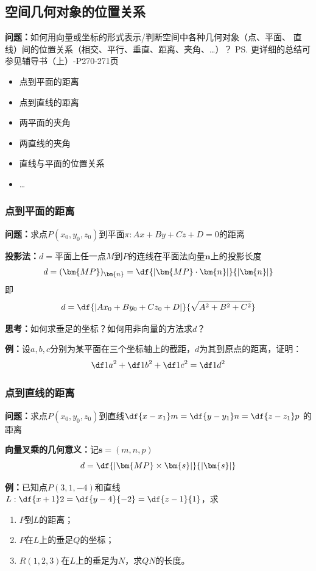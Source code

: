 \subsection{空间几何对象的位置关系}

{\bf 问题：}如何用向量或坐标的形式表示/判断空间中各种几何对象（点、平面、
直线）间的位置关系（相交、平行、垂直、距离、夹角、\ldots）？ 
\ps{更详细的总结可参见辅导书（上）-P270-271页}
\begin{itemize}
  \item 点到平面的距离 
  \item 点到直线的距离 
  \item 两平面的夹角 
  \item 两直线的夹角 
  \item 直线与平面的位置关系
  \item \ldots
\end{itemize}

\subsubsection{点到平面的距离}

{\bf 问题：}求点$P(x_0,y_0,z_0)$到平面$\pi:Ax+By+Cz+D=0$的距离

{\bf 投影法：}$d=$平面上任一点$M$到$P$的连线在平面法向量$\bm{n}$上的投影长度 
$$d=(\bm{MP})_{\bm{n}}=\df{|\bm{MP}\cdot\bm{n}|}{|\bm{n}|}$$ 
即
$${d=\df{|Ax_0+By_0+Cz_0+D|}{\sqrt{A^2+B^2+C^2}}}$$

{\bf 思考：}如何求垂足的坐标？如何用非向量的方法求$d$？

{\bf 例：}设$a,b,c$分别为某平面在三个坐标轴上的截距，$d$为其到原点的距离，证明：
$$\df1{a^2}+\df1{b^2}+\df1{c^2}=\df1{d^2}$$

\subsubsection{点到直线的距离}

{\bf 问题：}求点$P(x_0,y_0,z_0)$到直线$\df{x-x_1}m=\df{y-y_1}n=\df{z-z_1}p$
的距离

{\bf 向量叉乘的几何意义：}记$\bm{s}=(m,n,p)$
$$d=\df{|\bm{MP}\times\bm{s}|}{|\bm{s}|}$$

{\bf 例：}已知点$P(3,1,-4)$和直线$L:\df{x+1}2=\df{y-4}{-2}=\df{z-1}{1}$，求
\begin{enumerate}[(1)]
  \setlength{\itemindent}{1cm}
  \item $P$到$L$的距离；
  \item $P$在$L$上的垂足$Q$的坐标；
  \item $R(1,2,3)$在$L$上的垂足为$N$，求$QN$的长度。
\end{enumerate}

